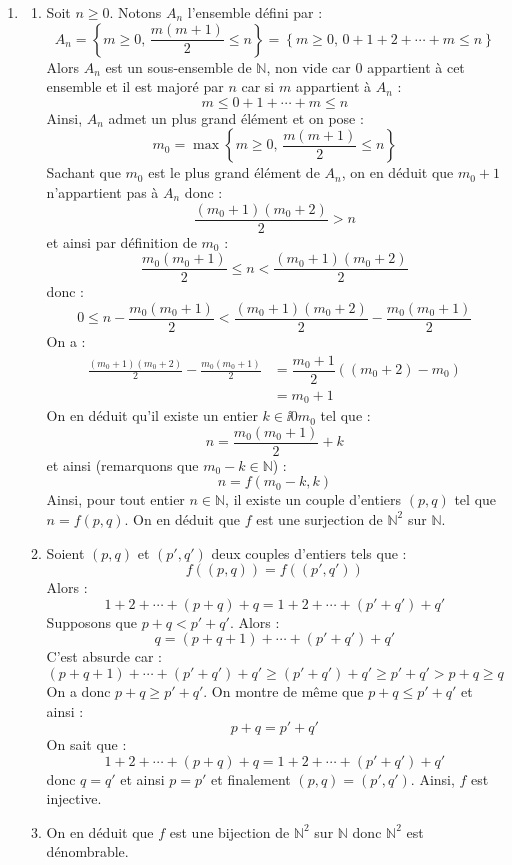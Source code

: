 \documentclass[a4paper,twoside,french,10pt]{VcCours}
\begin{document}
\begin{enumerate}
\item 
\begin{enumerate}
\item Soit $n \geq 0$. Notons $A_n$ l'ensemble défini par :
$$ A_n = \left\lbrace m \geq 0, \, \frac{m(m+1)}{2} \leq n \right\rbrace = \left\lbrace m \geq 0, \, 0+1+2+ \cdots + m \leq n \right\rbrace$$
Alors $A_n$ est un sous-ensemble de $\mathbb{N}$, non vide car $0$ appartient à cet ensemble et il est majoré par $n$ car si $m$ appartient à $A_n$ :
$$ m \leq 0+1+ \cdots + m \leq n$$
Ainsi, $A_n$ admet un plus grand élément et on pose :
$$ m_0 = \max \left\lbrace m \geq 0, \, \frac{m(m+1)}{2} \leq n \right\rbrace$$
Sachant que $m_0$ est le plus grand élément de $A_n$, on en déduit que $m_0+1$ n'appartient pas à $A_n$ donc :
$$ \frac{(m_0+1)(m_0+2)}{2} > n$$
et ainsi par définition de $m_0$ :
$$ \frac{m_0(m_0+1)}{2} \leq n  <\frac{(m_0+1)(m_0+2)}{2}$$
donc :
$$   0 \leq  n- \frac{m_0(m_0+1)}{2} <\frac{(m_0+1)(m_0+2)}{2} - \frac{m_0(m_0+1)}{2}$$
On a :
\begin{align*}
\frac{(m_0+1)(m_0+2)}{2} - \frac{m_0(m_0+1)}{2} & = \dfrac{m_0+1}{2} ((m_0+2)-m_0) \\
& = m_0+1 
\end{align*}
On en déduit qu'il existe un entier $k \in \ii{0}{m_0}$ tel que :
$$ n = \frac{m_0(m_0+1)}{2} + k$$
et ainsi (remarquons que $m_0-k \in \mathbb{N}$) : 
$$ n = f(m_0-k,k)$$
Ainsi, pour tout entier $n \in \mathbb{N}$, il existe un couple d'entiers $(p,q)$ tel que $n=f(p,q)$. On en déduit que $f$ est une surjection de $\mathbb{N}^2$ sur $\mathbb{N}$.
\item Soient $(p,q)$ et $(p',q')$ deux couples d'entiers tels que :
$$ f((p,q))=f((p',q'))$$
Alors :
$$ 1+2+ \cdots + (p+q) + q = 1+2+ \cdots + (p'+q') + q'$$
Supposons que $p+q<p'+q'$. Alors :
$$ q= (p+q+1)+ \cdots +(p'+q') + q'$$
C'est absurde car :
$$ (p+q+1)+ \cdots +(p'+q') + q' \geq (p'+q')+q' \geq p'+q'>p+q \geq q$$
On a donc $p+q \geq p'+q'$. On montre de même que $p+q \leq p'+q'$ et ainsi :
$$ p+q = p'+q'$$
On sait que :
$$  1+2+ \cdots + (p+q) + q = 1+2+ \cdots + (p'+q') + q'$$
donc $q=q'$ et ainsi $p=p'$ et finalement $(p,q)=(p',q')$. Ainsi, $f$ est injective.
\item On en déduit que $f$ est une bijection de $\mathbb{N}^2$ sur $\mathbb{N}$ donc $\mathbb{N}^2$ est dénombrable.
\end{enumerate}
\end{enumerate}
\end{document}
